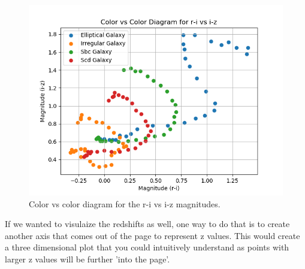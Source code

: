 \documentclass[12pt]{article}
\begin{document}
\begin{center}
	\begin{figure}[H]
	\includegraphics[scale=1.0]{r_i_vs_i_z.png}
	\caption{Color vs color diagram for the r-i vs i-z magnitudes.}
	\end{figure}
\end{center}

If we wanted to visulaize the redshifts as well, one way to do that is to create another axis that comes out of the page to represent z values. This would create a three dimensional plot that you could intuitively understand as points with larger z values will be further 'into the page'. 
\end{document}
